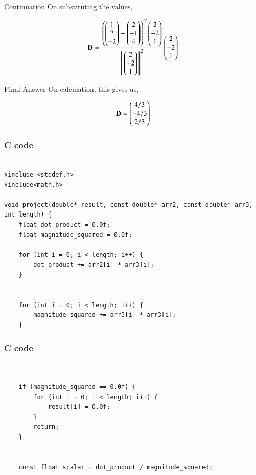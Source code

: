 \documentclass{beamer}
\begin{document}
\begin{frame}{Continuation}
    On substituting the values,

\begin{align}
    \textbf{D} = \frac{\left(\begin{pmatrix}1\\2\\-2\end{pmatrix}+\begin{pmatrix}2\\-1\\4\end{pmatrix}\right)^\text{T}\begin{pmatrix}2\\-2\\1\end{pmatrix}}{\left\lVert\begin{pmatrix}2\\-2\\1\end{pmatrix}\right\rVert^2}\begin{pmatrix}2\\-2\\1\end{pmatrix}
    \label{0.5}
\end{align}
\end{frame}

\begin{frame}{Final Answer}
    On calculation, this gives us,

\begin{align}
    \textbf{D} = \begin{pmatrix}4/3\\-4/3\\2/3\end{pmatrix}
    \label{0.6}
\end{align}
\end{frame}

\begin{frame}[fragile]
\frametitle{C code}
\begin{lstlisting}

#include <stddef.h>
#include<math.h>

void project(double* result, const double* arr2, const double* arr3, int length) {
    float dot_product = 0.0f;
    float magnitude_squared = 0.0f;
    
    for (int i = 0; i < length; i++) {
        dot_product += arr2[i] * arr3[i];
    }

    
    for (int i = 0; i < length; i++) {
        magnitude_squared += arr3[i] * arr3[i];
    }

\end{lstlisting}
\end{frame}

\begin{frame}[fragile]
\frametitle{C code}
\begin{lstlisting}

    
    if (magnitude_squared == 0.0f) {
        for (int i = 0; i < length; i++) {
            result[i] = 0.0f;
        }
        return;
    }

    
    const float scalar = dot_product / magnitude_squared;

\end{lstlisting}
\end{frame}
\end{document}
